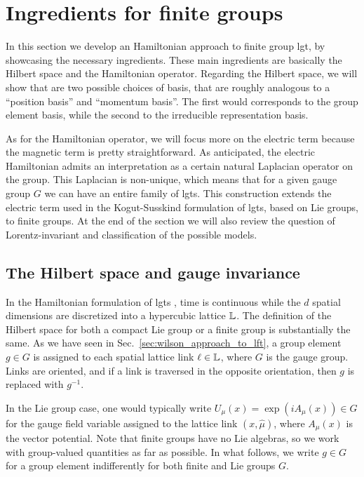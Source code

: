 \section{Ingredients for finite groups}
\label{sec:finite_group_gauge_theory}

In this section we develop an Hamiltonian approach to finite group \ac{lgt}, by showcasing the necessary ingredients.
These main ingredients are basically the Hilbert space and the Hamiltonian operator.
Regarding the Hilbert space, we will show that are two possible choices of basis, that are roughly analogous to a ``position basis'' and ``momentum basis''.
The first would corresponds to the group element basis, while the second to the irreducible representation basis.

As for the Hamiltonian operator, we will focus more on the electric term because the magnetic term is pretty straightforward.
As anticipated, the electric Hamiltonian admits an interpretation as a certain natural Laplacian operator on the group.
This Laplacian is non-unique, which means that for a given gauge group $G$ we can have an entire family of \acp{lgt}.
This construction extends the electric term used in the Kogut-Susskind formulation \cite{kogut1975hamiltonian} of \acp{lgt}, based on Lie groups, to finite groups.
At the end of the section we will also review the question of Lorentz-invariant and classification of the possible models.


\subsection{The Hilbert space and gauge invariance}%
\label{sub:the_hilbert_space}

In the Hamiltonian formulation of \acp{lgt} \cite{kogut1975hamiltonian, milstead2018qyangmills, zohar2015latticegauge}, time is continuous while the $d$ spatial dimensions are discretized into a hypercubic lattice $\mathbb{L}$.
The definition of the Hilbert space for both a compact Lie group or a finite group is substantially the same.
As we have seen in Sec.~\ref{sec:wilson_approach_to_lft}, a group element $g \in G$ is assigned to each spatial lattice link $\ell \in \mathbb{L}$, where $G$ is the gauge group.
Links are oriented, and if a link is traversed in the opposite orientation, then $g$ is replaced with $g^{-1}$.

In the Lie group case, one would typically write $U_\mu(x) = \exp{(iA_\mu(x))} \in G$ for the gauge field variable assigned to the lattice link $(x, \hat{\mu})$, where $A_\mu(x)$ is the vector potential.
Note that finite groups have no Lie algebras, so we work with group-valued quantities as far as possible.
In what follows, we write $g \in G$ for a group element indifferently for both finite and Lie groups $G$.

